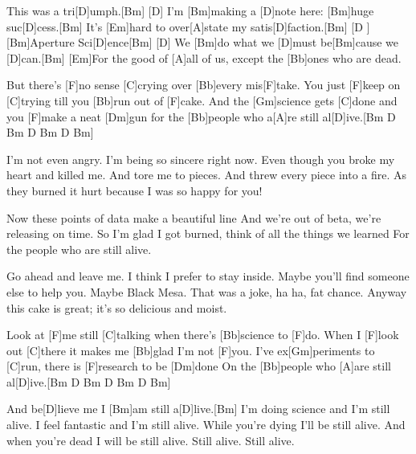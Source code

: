 

\begin{guitar}
	This was a tri[D]umph.[Bm]{}
	[D] I'm [Bm]making a [D]note here: [Bm]huge suc[D]cess.[Bm]{}
	It's [Em]hard to over[A]state my satis[D]faction.[Bm]{}
	[D ] [Bm]Aperture Sci[D]ence[Bm]{}
	[D] We [Bm]do what we [D]must be[Bm]cause we [D]can.[Bm]{}
	[Em]For the good of [A]all of us, except the [Bb]ones who are dead.
	
	\begin{highlightbar}
		But there's [F]no sense [C]crying over [Bb]every mis[F]take.
		You just [F]keep on [C]trying till you [Bb]run out of [F]cake.
		And the [Gm]science gets [C]done and you [F]make a neat [Dm]gun
		for the [Bb]people who a[A]re still al[D]ive.[Bm D Bm D Bm D Bm]{}
	\end{highlightbar}
	
	\songsection{Verse 2}
	I'm not even angry.
	I'm being so sincere right now.
	Even though you broke my heart and killed me.
	And tore me to pieces.
	And threw every piece into a fire.
	As they burned it hurt because I was so happy for you!
	
	\begin{highlightbar}
		\songsection{Chorus 2}
		Now these points of data make a beautiful line
		And we're out of beta, we're releasing on time.
		So I'm glad I got burned, think of all the things we learned
		For the people who are still alive.
	\end{highlightbar}
	
	\songsection{Verse 3}
	Go ahead and leave me.
	I think I prefer to stay inside.
	Maybe you'll find someone else to help you.
	Maybe Black Mesa.
	That was a joke, ha ha, fat chance.
	Anyway this cake is great; it's so delicious and moist.
	
	\begin{highlightbar}
		\songsection{Chorus 3}
		Look at [F]me still [C]talking when there's [Bb]science to [F]do.
		When I [F]look out [C]there it makes me [Bb]glad I'm not [F]you.
		I've ex[Gm]periments to [C]run, there is [F]research to be [Dm]done
		On the [Bb]people who [A]are still al[D]ive.[Bm D Bm D Bm D Bm]{}
	\end{highlightbar}
	
	And be[D]lieve me I [Bm]am still a[D]live.[Bm]{}	
	I'm doing science and I'm still alive.
	I feel fantastic and I'm still alive.
	While you're dying I'll be still alive.
	And when you're dead I will be still alive.
	Still alive. Still alive.
	
\end{guitar}